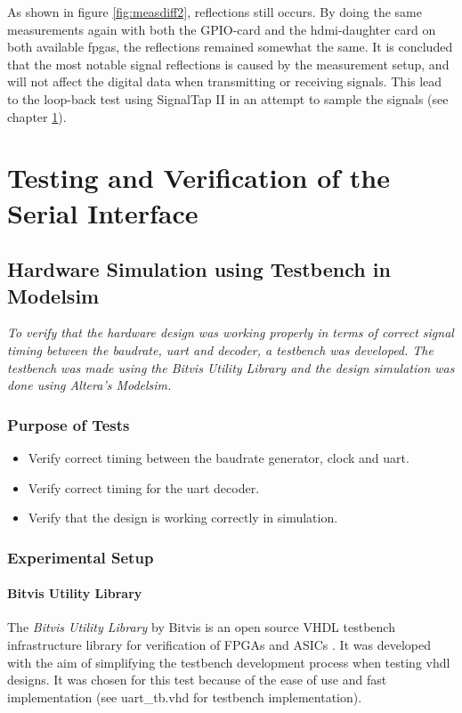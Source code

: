 \documentclass[main.tex]{subfiles}
\begin{document}
As shown in figure \ref{fig:measdiff2}, reflections still occurs. By doing the same measurements again with both the GPIO-card and the \gls{hdmi}-daughter card on both available \glspl{fpga}, the reflections remained somewhat the same. It is concluded that the most notable signal reflections is caused by the measurement setup, and will not affect the digital data when transmitting or receiving signals. This lead to the loop-back test using SignalTap II in an attempt to sample the signals (see chapter \ref{chap:sertest}).



\chapter{Testing and Verification of the Serial Interface} \label{chap:sertest}

\section{Hardware Simulation using Testbench in Modelsim}

\textit{To verify that the hardware design was working properly in terms of correct signal timing between the baudrate, \acrshort{uart} and decoder, a testbench was developed. The testbench was made using the \textit{Bitvis Utility Library} and the design simulation was done using Altera's Modelsim.}

\subsection{Purpose of Tests}

\begin{itemize}\setlength{\itemsep}{10pt}
\item Verify correct timing between the baudrate generator, clock and uart.
\item Verify correct timing for the uart decoder.
\item Verify that the design is working correctly in simulation.
\end{itemize}

\subsection{Experimental Setup}
\subsubsection{Bitvis Utility Library}
The \textit{Bitvis Utility Library} by Bitvis is an open source VHDL testbench infrastructure library for verification of FPGAs and ASICs \cite{bitvis16}. It was developed with the aim of simplifying the testbench development process when testing \acrshort{vhdl} designs. It was chosen for this test because of the ease of use and fast implementation (see uart\_tb.vhd for testbench implementation).\\
\end{document}
